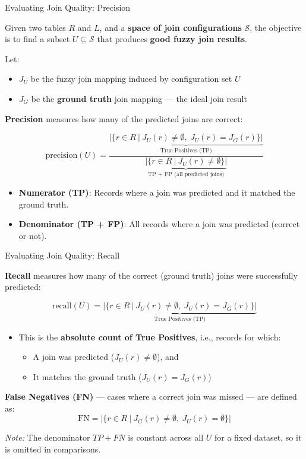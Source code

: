 \documentclass[8pt]{beamer} %
\begin{document}
\begin{frame}{Evaluating Join Quality: Precision}
	
	Given two tables $R$ and $L$, and a \textbf{space of join configurations} $\mathcal{S}$, the objective is to find a subset $U \subseteq \mathcal{S}$ that produces \textbf{good fuzzy join results}.
	
	Let:
	\begin{itemize}
		\item $J_U$ be the fuzzy join mapping induced by configuration set $U$
		\item $J_G$ be the \textbf{ground truth} join mapping — the ideal join result
	\end{itemize}
	
	\vspace{0.5em}
	\textbf{Precision} measures how many of the predicted joins are correct:
	
	\[
	\text{precision}(U) =
	\frac{
		\underbrace{|\{ r \in R\ |\ J_U(r) \neq \emptyset,\ J_U(r) = J_G(r) \}|}_{\text{True Positives (TP)}}
	}{
		\underbrace{|\{ r \in R\ |\ J_U(r) \neq \emptyset \}|}_{\text{TP + FP (all predicted joins)}}
	}
	\tag{3}
	\]
	
	\begin{itemize}
		\item \textbf{Numerator (TP)}: Records where a join was predicted and it matched the ground truth.
		\item \textbf{Denominator (TP + FP)}: All records where a join was predicted (correct or not).
	\end{itemize}
	
\end{frame}


\begin{frame}{Evaluating Join Quality: Recall}
	
	\textbf{Recall} measures how many of the correct (ground truth) joins were successfully predicted:
	
	\[
	\text{recall}(U) =
	\underbrace{|\{ r \in R\ |\ J_U(r) \neq \emptyset,\ J_U(r) = J_G(r) \}|}_{\text{True Positives (TP)}}
	\tag{4}
	\]
	
	\begin{itemize}
		\item This is the \textbf{absolute count of True Positives}, i.e., records for which:
		\begin{itemize}
			\item A join was predicted ($J_U(r) \neq \emptyset$), and
			\item It matches the ground truth ($J_U(r) = J_G(r)$)
		\end{itemize}
	\end{itemize}
	
	\vspace{0.5em}
	\textbf{False Negatives (FN)} — cases where a correct join was missed — are defined as:
	\[
	\text{FN} = |\{ r \in R\ |\ J_G(r) \neq \emptyset,\ J_U(r) = \emptyset \}|
	\]
	
	\textit{Note:} The denominator $TP + FN$ is constant across all $U$ for a fixed dataset, so it is omitted in comparisons.
	
\end{frame}
\end{document}
